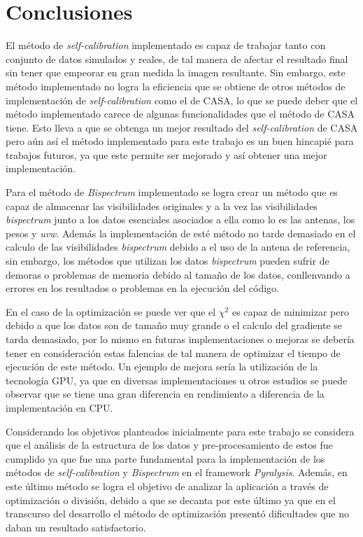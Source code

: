 \chapter{Conclusiones}
\label{cap:conclusiones}

El método de \textit{self-calibration} implementado es capaz de trabajar tanto con conjunto de datos simulados y reales, de tal manera de afectar el resultado final sin tener que empeorar en gran medida la imagen resultante. Sin embargo, este método implementado no logra la eficiencia que se obtiene de otros métodos de implementación de \textit{self-calibration} como el de CASA, lo que se puede deber que el método implementado carece de algunas funcionalidades que el método de CASA tiene. Esto lleva a que se obtenga un mejor resultado del \textit{self-calibration} de CASA pero aún así el método implementado para este trabajo es un buen hincapié para trabajos futuros, ya que este permite ser mejorado y así obtener una mejor implementación. 

Para el método de \textit{Bispectrum} implementado se logra crear un método que es capaz de almacenar las visibilidades originales y a la vez las visibilidades \textit{bispectrum} junto a los datos esenciales asociados a ella como lo es las antenas, los pesos y \textit{uvw}. Además la implementación de esté método no tarde demasiado en el calculo de las visibilidades \textit{bispectrum} debido a el uso de la antena de referencia, sin embargo, los métodos que utilizan los datos \textit{bispectrum} pueden sufrir de demoras o problemas de memoria debido al tamaño de los datos, conllenvando a errores en los resultados o problemas en la ejecución del código. 

En el caso de la optimización se puede ver que el $\chi^{2}$ es capaz de minimizar pero debido a que los datos son de tamaño muy grande o el calculo del gradiente se tarda demasiado, por lo mismo en futuras implementaciones o mejoras se debería tener en consideración estas falencias de tal manera de optimizar el tiempo de ejecución de este método. Un ejemplo de mejora sería la utilización de la tecnología GPU, ya que en diversas implementaciones u otros estudios se puede observar que se tiene una gran diferencia en rendimiento a diferencia de la implementación en CPU.  

Considerando los objetivos planteados inicialmente para este trabajo se considera que el análisis de la estructura de los datos y pre-procesamiento de estos fue cumplido ya que fue una parte fundamental para la implementación de los métodos de \textit{self-calibration} y \textit{Bispectrum} en el framework \textit{Pyralysis}. Además, en este último método se logra el objetivo de analizar la aplicación a través de optimización o división, debido a que se decanta por este último ya que en el transcurso del desarrollo el método de optimización presentó dificultades que no daban un resultado satisfactorio. 

